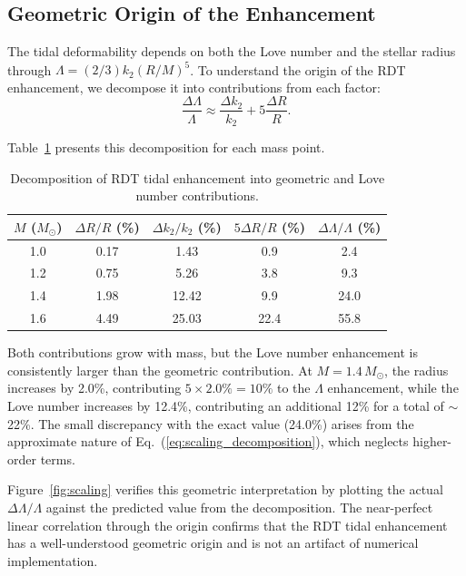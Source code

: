 \documentclass[twocolumn,showpacs,preprintnumbers,amsmath,amssymb,prd]{revtex4-2}
\begin{document}
\subsection{Geometric Origin of the Enhancement}
\label{sec:results_scaling}

The tidal deformability depends on both the Love number and the stellar radius through $\Lambda = (2/3)k_2(R/M)^5$. To understand the origin of the RDT enhancement, we decompose it into contributions from each factor:
\begin{equation}
\frac{\Delta\Lambda}{\Lambda} \approx \frac{\Delta k_2}{k_2} + 5\frac{\Delta R}{R}.
\label{eq:scaling_decomposition}
\end{equation}

Table~\ref{tab:scaling} presents this decomposition for each mass point.

\begin{table}[h]
\caption{Decomposition of RDT tidal enhancement into geometric and Love number contributions.}
\label{tab:scaling}
\begin{ruledtabular}
\begin{tabular}{ccccc}
$M$ ($M_\odot$) & $\Delta R/R$ (\%) & $\Delta k_2/k_2$ (\%) & $5\Delta R/R$ (\%) & $\Delta\Lambda/\Lambda$ (\%) \\
\hline
1.0 & 0.17 & 1.43 & 0.9 & 2.4 \\
1.2 & 0.75 & 5.26 & 3.8 & 9.3 \\
1.4 & 1.98 & 12.42 & 9.9 & 24.0 \\
1.6 & 4.49 & 25.03 & 22.4 & 55.8 \\
\end{tabular}
\end{ruledtabular}
\end{table}

Both contributions grow with mass, but the Love number enhancement is consistently larger than the geometric contribution. At $M = 1.4\,M_\odot$, the radius increases by 2.0\%, contributing $5 \times 2.0\% = 10\%$ to the $\Lambda$ enhancement, while the Love number increases by 12.4\%, contributing an additional 12\% for a total of $\sim$22\%. The small discrepancy with the exact value (24.0\%) arises from the approximate nature of Eq.~(\ref{eq:scaling_decomposition}), which neglects higher-order terms.

Figure~\ref{fig:scaling} verifies this geometric interpretation by plotting the actual $\Delta\Lambda/\Lambda$ against the predicted value from the decomposition. The near-perfect linear correlation through the origin confirms that the RDT tidal enhancement has a well-understood geometric origin and is not an artifact of numerical implementation.
\end{document}
